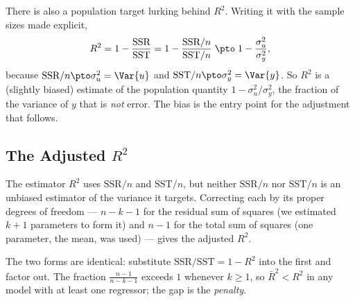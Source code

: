 There is also a population target lurking behind $R^2$. Writing it with the sample sizes made explicit,
\[
R^2 = 1 - \frac{\text{SSR}}{\text{SST}} = 1 - \frac{\text{SSR}/n}{\text{SST}/n}
\;\pto\; 1 - \frac{\sigma_u^2}{\sigma_y^2},
\]
because $\text{SSR}/n \pto \sigma_u^2 = \Var{u}$ and $\text{SST}/n \pto \sigma_y^2 = \Var{y}$. So $R^2$ is a (slightly biased) estimate of the population quantity $1 - \sigma_u^2/\sigma_y^2$, the fraction of the variance of $y$ that is \emph{not} error. The bias is the entry point for the adjustment that follows.

\subsection{The Adjusted \texorpdfstring{$R^2$}{R-squared}}

The estimator $R^2$ uses $\text{SSR}/n$ and $\text{SST}/n$, but neither $\text{SSR}/n$ nor $\text{SST}/n$ is an unbiased estimator of the variance it targets. Correcting each by its proper degrees of freedom --- $n-k-1$ for the residual sum of squares (we estimated $k+1$ parameters to form it) and $n-1$ for the total sum of squares (one parameter, the mean, was used) --- gives the adjusted $R^2$.


The two forms are identical: substitute $\text{SSR}/\text{SST} = 1 - R^2$ into the first and factor out. The fraction $\tfrac{n-1}{n-k-1}$ exceeds $1$ whenever $k\ge 1$, so $\bar R^2 < R^2$ in any model with at least one regressor; the gap is the \emph{penalty}.


